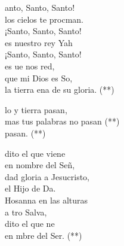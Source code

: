 \begin{cancion}[Santo][Carismático]%
	anto, Santo, Santo! \\
	los cielos te procman.\\
¡Santo, Santo, Santo! \\
	es nuestro rey Yah\\
	¡Santo, Santo, Santo! \\
	es ue nos red,\\
	que mi Dios es So, \\
	la tierra ena de su gloria. (**)\\
	\begin{chorus}%
	lo y tierra pasan, \\
	mas tus palabras no pasan (**)\\
	   pasan. (**)\\
	\end{chorus}%
	dito el que viene \\
	en nombre del Señ, \\
dad gloria a Jesucristo, \\
	el Hijo de Da.\\
Hosanna en las alturas \\
	a tro Salva,\\
	dito el que ne \\
	en mbre del Ser. (**)\\
\end{cancion}%
